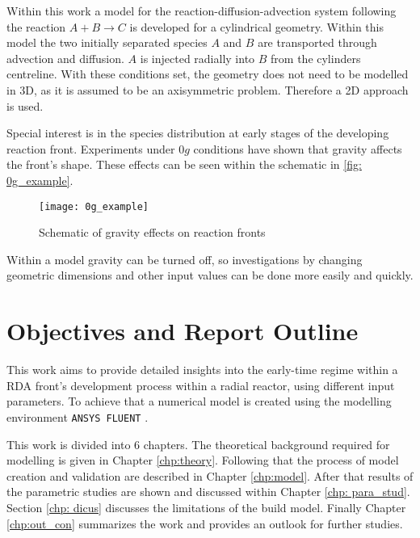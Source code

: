 \documentclass[../thesis.tex]{subfiles}
\begin{document}
Within this work a model for the reaction-diffusion-advection system following the reaction $ A+B \rightarrow C$ is developed for a cylindrical geometry. Within this model the two initially separated species $A$ and $B$ are transported through advection and diffusion. $A$ is injected radially into $B$ from the cylinders centreline. With these conditions set, the geometry does not need to be modelled in 3D, as it is assumed to be an axisymmetric problem. Therefore a 2D approach is used.

Special interest is in the species distribution at early stages of the developing reaction front. Experiments under $0g$ conditions \cite{stergiou2022effects} have shown that gravity affects the front's shape. These effects can be seen within the schematic in \autoref{fig: 0g_example}.
\begin{figure}[htbp]
	\centering
	\texttt{[image: 0g\_example]}
	\caption{Schematic of gravity effects on reaction fronts \cite{stergiou2022effects}}
	\label{fig: 0g_example}
\end{figure}
Within a model gravity can be turned off, so investigations by changing geometric dimensions and other input values can be done more easily and quickly.

\section{Objectives and Report Outline}

This work aims to provide detailed insights into the early-time regime within a RDA front's development process within a radial reactor, using different input parameters. To achieve that a numerical model is created using the modelling environment \texttt{ANSYS FLUENT} \cite{manual2009ansys}. 

This work is divided into 6 chapters. The theoretical background required for modelling is given in Chapter \ref{chp:theory}. Following that the process of model creation and validation are described in Chapter \ref{chp:model}. After that results of the parametric studies are shown and discussed within Chapter \ref{chp: para_stud}. Section \ref{chp: dicus} discusses the limitations of the build model. Finally Chapter \ref{chp:out_con} summarizes the work and provides an outlook for further studies. 
\end{document}
